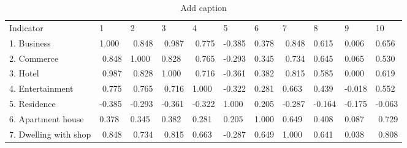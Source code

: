 %
\begin{sidewaystable}[htbp]
	\centering
	\caption{Add caption}
	\label{tab:chp2:CorrelationAnalysis}
	\small
	\renewcommand{\arraystretch}{1.5} %
	\begin{tabular}{p{9em}|p{3em}<{\raggedleft}|p{3em}<{\raggedleft}|p{3em}<{\raggedleft}|p{3em}<{\raggedleft}|p{3em}<{\raggedleft}|p{3em}<{\raggedleft}|p{3em}<{\raggedleft}|p{3em}<{\raggedleft}|p{3em}<{\raggedleft}|p{3em}<{\raggedleft}}
		\Xhline{1.5pt}
		Indicator & 1 & 2 & 3 & 4 & 5 & 6 & 7 & 8 & 9 & 10 \\
		
		\Xhline{0.5pt}
		1. Business & 1.000 & \multicolumn{1}{r|}{\cellcolor[rgb]{ 0.8, 0.8, 0.8} 0.848} & \multicolumn{1}{r|}{\cellcolor[rgb]{ 0.8, 0.8, 0.8} 0.987} & \multicolumn{1}{r|}{\cellcolor[rgb]{ 0.8, 0.8, 0.8} 0.775} & -0.385 & 0.378  & \multicolumn{1}{r|}{\cellcolor[rgb]{ 0.8, 0.8, 0.8} 0.848} & 0.615  & 0.006  & 0.656 \\
		
		2. Commerce & \multicolumn{1}{r|}{\cellcolor[rgb]{ 0.8, 0.8, 0.8} 0.848} & 1.000 & 0.828  & \multicolumn{1}{r|}{\cellcolor[rgb]{ 0.8, 0.8, 0.8} 0.765} & -0.293 & 0.345  & \multicolumn{1}{r|}{\cellcolor[rgb]{ 0.8, 0.8, 0.8} 0.734} & 0.645  & 0.065  & 0.530 \\
		
		3. Hotel & \multicolumn{1}{r|}{\cellcolor[rgb]{ 0.8, 0.8, 0.8} 0.987} & \multicolumn{1}{r|}{\cellcolor[rgb]{ 0.8, 0.8, 0.8} 0.828} & 1.000 & \multicolumn{1}{r|}{\cellcolor[rgb]{ 0.8, 0.8, 0.8} 0.716} & -0.361 & 0.382  & \multicolumn{1}{r|}{\cellcolor[rgb]{ 0.8, 0.8, 0.8} 0.815} & 0.585  & 0.000  & 0.619 \\
		
		4. Entertainment & \multicolumn{1}{r|}{\cellcolor[rgb]{ 0.8, 0.8, 0.8} 0.775} & \multicolumn{1}{r|}{\cellcolor[rgb]{ 0.8, 0.8, 0.8} 0.765} & \multicolumn{1}{r|}{\cellcolor[rgb]{ 0.8, 0.8, 0.8} 0.716} & 1.000 & -0.322 & 0.281  & 0.663  & 0.439  & -0.018 & 0.552 \\
		
		5. Residence & -0.385 & -0.293 & -0.361 & -0.322 & 1.000 & 0.205  & -0.287 & -0.164 & -0.175 & -0.063 \\
		
		6. Apartment house & 0.378  & 0.345  & 0.382  & 0.281  & 0.205  & 1.000 & 0.649  & 0.408  &0.087  & \multicolumn{1}{r}{\cellcolor[rgb]{ 0.8, 0.8, 0.8} 0.729} \\
		
		7. Dwelling with shop & \multicolumn{1}{r|}{\cellcolor[rgb]{ 0.8, 0.8, 0.8} 0.848} & \multicolumn{1}{r|}{\cellcolor[rgb]{ 0.8, 0.8, 0.8} 0.734} & \multicolumn{1}{r|}{\cellcolor[rgb]{ 0.8, 0.8, 0.8} 0.815} & 0.663  & -0.287 & 0.649  & 1.000 & 0.641  & 0.038  & \multicolumn{1}{r}{\cellcolor[rgb]{ 0.8, 0.8, 0.8} 0.808} \\
		

\end{tabular}
\end{sidewaystable}
